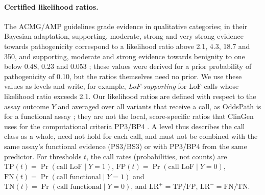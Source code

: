 \paragraph{Certified likelihood ratios.}
The ACMG/AMP guidelines \cite{Richards2015} grade evidence in qualitative categories; in their Bayesian adaptation, supporting,
moderate, strong and very strong evidence towards pathogenicity correspond to a likelihood ratio above 2.1, 4.3, 18.7
and 350, and supporting, moderate and strong evidence towards benignity to one below 0.48, 0.23 and 0.053 \cite{Tavtigian2018,Brnich2020}; these values were derived for a prior probability of
pathogenicity of 0.10, but the ratios themselves need no prior. We use these values as levels and write, for example, \emph{LoF-supporting} for LoF
calls whose likelihood ratio exceeds 2.1. Our likelihood ratios are defined with respect to the assay outcome $Y$ and
averaged over all variants that receive a call, as OddsPath is for a functional assay \cite{Brnich2020}; they are not
the local, score-specific ratios that ClinGen uses for the computational criteria PP3/BP4 \cite{Pejaver2022}. A level thus describes the call class as a
whole, need not hold for each call, and must not be combined with the same assay's functional evidence (PS3/BS3) or
with PP3/BP4 from the same predictor. For
thresholds $t$, the call rates (probabilities, not counts) are $\mathrm{TP}(t)=\Pr(\text{call LoF}\mid Y=1)$,
$\mathrm{FP}(t)=\Pr(\text{call LoF}\mid Y=0)$, $\mathrm{FN}(t)=\Pr(\text{call functional}\mid Y=1)$ and
$\mathrm{TN}(t)=\Pr(\text{call functional}\mid Y=0)$, and $\mathrm{LR}^+=\mathrm{TP}/\mathrm{FP}$,
$\mathrm{LR}^-=\mathrm{FN}/\mathrm{TN}$.

